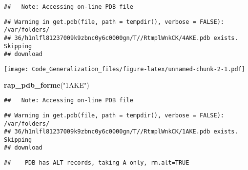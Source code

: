 \documentclass[]{article}
\newenvironment{Shaded}{\begin{snugshade}}{\end{snugshade}}
\newcommand{\KeywordTok}[1]{\textcolor[rgb]{0.13,0.29,0.53}{\textbf{#1}}}
\newcommand{\DataTypeTok}[1]{\textcolor[rgb]{0.13,0.29,0.53}{#1}}
\newcommand{\StringTok}[1]{\textcolor[rgb]{0.31,0.60,0.02}{#1}}
\newcommand{\ControlFlowTok}[1]{\textcolor[rgb]{0.13,0.29,0.53}{\textbf{#1}}}
\newcommand{\OperatorTok}[1]{\textcolor[rgb]{0.81,0.36,0.00}{\textbf{#1}}}
\newcommand{\NormalTok}[1]{#1}
\begin{document}
\begin{Shaded}
\end{Shaded}

\begin{verbatim}
##   Note: Accessing on-line PDB file
\end{verbatim}

\begin{verbatim}
## Warning in get.pdb(file, path = tempdir(), verbose = FALSE): /var/folders/
## 36/h1nlfl81237009k9zbnc0y6c0000gn/T//RtmplWnkCK/4AKE.pdb exists. Skipping
## download
\end{verbatim}

\texttt{[image: Code\_Generalization\_files/figure-latex/unnamed-chunk-2-1.pdf]}

\begin{Shaded}
\begin{Highlighting}[]
\KeywordTok{rap_pdb_forme}\NormalTok{(}\StringTok{"1AKE"}\NormalTok{)}
\end{Highlighting}
\end{Shaded}

\begin{verbatim}
##   Note: Accessing on-line PDB file
\end{verbatim}

\begin{verbatim}
## Warning in get.pdb(file, path = tempdir(), verbose = FALSE): /var/folders/
## 36/h1nlfl81237009k9zbnc0y6c0000gn/T//RtmplWnkCK/1AKE.pdb exists. Skipping
## download
\end{verbatim}

\begin{verbatim}
##    PDB has ALT records, taking A only, rm.alt=TRUE
\end{verbatim}
\end{document}
